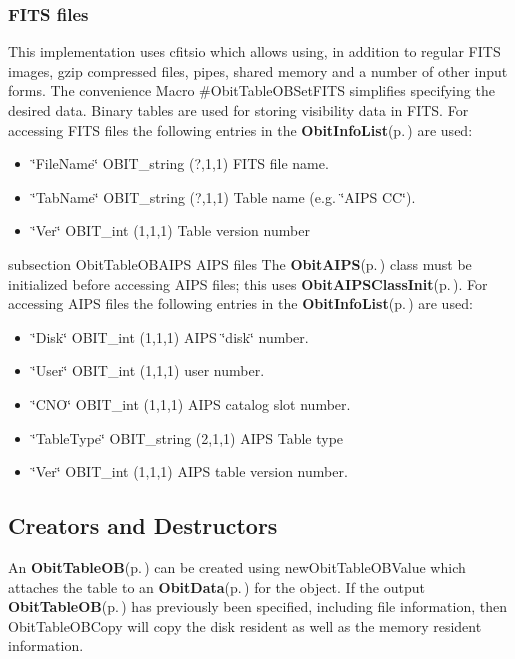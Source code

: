 \subsubsection{FITS files}\label{ObitTableWX_8h_TableFITS}
This implementation uses cfitsio which allows using, in addition to regular FITS images, gzip compressed files, pipes, shared memory and a number of other input forms. The convenience Macro \#Obit\-Table\-OBSet\-FITS simplifies specifying the desired data. Binary tables are used for storing visibility data in FITS. For accessing FITS files the following entries in the {\bf Obit\-Info\-List}{\rm (p.\,\pageref{structObitInfoList})} are used: \begin{itemize}
\item \char`\"{}File\-Name\char`\"{} OBIT\_\-string (?,1,1) FITS file name. \item \char`\"{}Tab\-Name\char`\"{} OBIT\_\-string (?,1,1) Table name (e.g. \char`\"{}AIPS CC\char`\"{}). \item \char`\"{}Ver\char`\"{} OBIT\_\-int (1,1,1) Table version number\end{itemize}
subsection Obit\-Table\-OBAIPS AIPS files The {\bf Obit\-AIPS}{\rm (p.\,\pageref{structObitAIPS})} class must be initialized before accessing AIPS files; this uses {\bf Obit\-AIPSClass\-Init}{\rm (p.\,\pageref{ObitAIPS_8c_a5})}. For accessing AIPS files the following entries in the {\bf Obit\-Info\-List}{\rm (p.\,\pageref{structObitInfoList})} are used: \begin{itemize}
\item \char`\"{}Disk\char`\"{} OBIT\_\-int (1,1,1) AIPS \char`\"{}disk\char`\"{} number. \item \char`\"{}User\char`\"{} OBIT\_\-int (1,1,1) user number. \item \char`\"{}CNO\char`\"{} OBIT\_\-int (1,1,1) AIPS catalog slot number. \item \char`\"{}Table\-Type\char`\"{} OBIT\_\-string (2,1,1) AIPS Table type \item \char`\"{}Ver\char`\"{} OBIT\_\-int (1,1,1) AIPS table version number.\end{itemize}
\subsection{Creators and Destructors}\label{ObitTableOB_8h_ObitTableOBaccess}
An {\bf Obit\-Table\-OB}{\rm (p.\,\pageref{structObitTableOB})} can be created using new\-Obit\-Table\-OBValue which attaches the table to an {\bf Obit\-Data}{\rm (p.\,\pageref{structObitData})} for the object. If the output {\bf Obit\-Table\-OB}{\rm (p.\,\pageref{structObitTableOB})} has previously been specified, including file information, then Obit\-Table\-OBCopy will copy the disk resident as well as the memory resident information.

